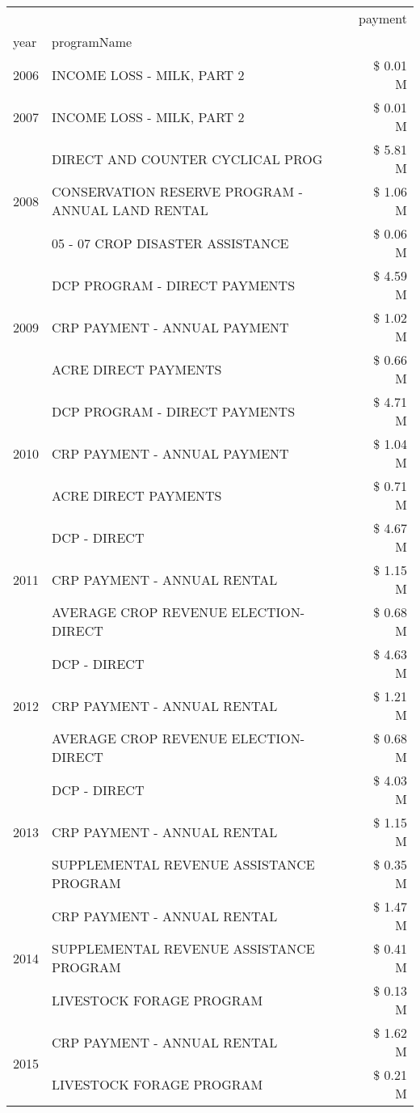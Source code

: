 \begin{tabular}{llr}
\toprule
 &  & payment \\
year & programName &  \\
\midrule
2006 & INCOME LOSS - MILK, PART 2 & \$ 0.01 M \\
\cline{1-3}
2007 & INCOME LOSS - MILK, PART 2 & \$ 0.01 M \\
\cline{1-3}
\multirow[t]{3}{*}{2008} & DIRECT AND COUNTER CYCLICAL PROG & \$ 5.81 M \\
 & CONSERVATION RESERVE PROGRAM - ANNUAL LAND RENTAL & \$ 1.06 M \\
 & 05 - 07 CROP DISASTER ASSISTANCE & \$ 0.06 M \\
\cline{1-3}
\multirow[t]{3}{*}{2009} & DCP PROGRAM - DIRECT PAYMENTS & \$ 4.59 M \\
 & CRP PAYMENT - ANNUAL PAYMENT & \$ 1.02 M \\
 & ACRE DIRECT PAYMENTS & \$ 0.66 M \\
\cline{1-3}
\multirow[t]{3}{*}{2010} & DCP PROGRAM - DIRECT PAYMENTS & \$ 4.71 M \\
 & CRP PAYMENT - ANNUAL PAYMENT & \$ 1.04 M \\
 & ACRE DIRECT PAYMENTS & \$ 0.71 M \\
\cline{1-3}
\multirow[t]{3}{*}{2011} & DCP - DIRECT & \$ 4.67 M \\
 & CRP PAYMENT - ANNUAL RENTAL & \$ 1.15 M \\
 & AVERAGE CROP REVENUE ELECTION-DIRECT & \$ 0.68 M \\
\cline{1-3}
\multirow[t]{3}{*}{2012} & DCP - DIRECT & \$ 4.63 M \\
 & CRP PAYMENT - ANNUAL RENTAL & \$ 1.21 M \\
 & AVERAGE CROP REVENUE ELECTION-DIRECT & \$ 0.68 M \\
\cline{1-3}
\multirow[t]{3}{*}{2013} & DCP - DIRECT & \$ 4.03 M \\
 & CRP PAYMENT - ANNUAL RENTAL & \$ 1.15 M \\
 & SUPPLEMENTAL REVENUE ASSISTANCE PROGRAM & \$ 0.35 M \\
\cline{1-3}
\multirow[t]{3}{*}{2014} & CRP PAYMENT - ANNUAL RENTAL & \$ 1.47 M \\
 & SUPPLEMENTAL REVENUE ASSISTANCE PROGRAM & \$ 0.41 M \\
 & LIVESTOCK FORAGE PROGRAM & \$ 0.13 M \\
\cline{1-3}
\multirow[t]{3}{*}{2015} & CRP PAYMENT - ANNUAL RENTAL & \$ 1.62 M \\
 & LIVESTOCK FORAGE PROGRAM & \$ 0.21 M \\

\end{tabular}
